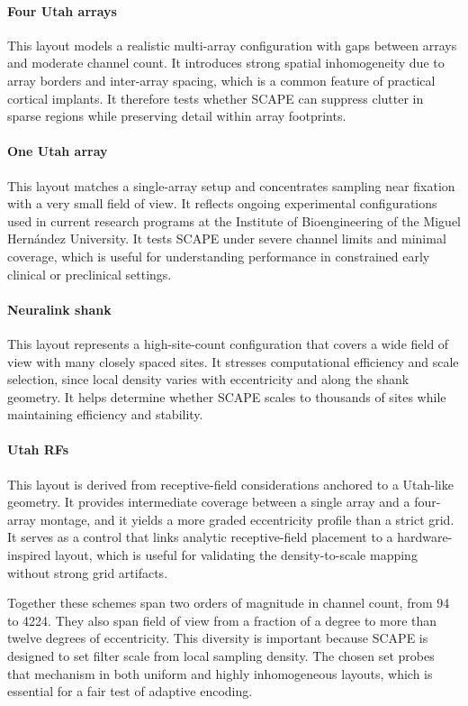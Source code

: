 \paragraph{Four Utah arrays}
This layout models a realistic multi-array configuration with gaps between arrays and moderate channel count. It introduces strong spatial inhomogeneity due to array borders and inter-array spacing, which is a common feature of practical cortical implants. It therefore tests whether SCAPE can suppress clutter in sparse regions while preserving detail within array footprints.

\paragraph{One Utah array}
This layout matches a single-array setup and concentrates sampling near fixation with a very small field of view. It reflects ongoing experimental configurations used in current research programs at the Institute of Bioengineering of the Miguel Hernández University. It tests SCAPE under severe channel limits and minimal coverage, which is useful for understanding performance in constrained early clinical or preclinical settings.

\paragraph{Neuralink shank}
This layout represents a high-site-count configuration that covers a wide field of view with many closely spaced sites. It stresses computational efficiency and scale selection, since local density varies with eccentricity and along the shank geometry. It helps determine whether SCAPE scales to thousands of sites while maintaining efficiency and stability.

\paragraph{Utah RFs}
This layout is derived from receptive-field considerations anchored to a Utah-like geometry. It provides intermediate coverage between a single array and a four-array montage, and it yields a more graded eccentricity profile than a strict grid. It serves as a control that links analytic receptive-field placement to a hardware-inspired layout, which is useful for validating the density-to-scale mapping without strong grid artifacts.

\medskip
Together these schemes span two orders of magnitude in channel count, from 94 to 4224. They also span field of view from a fraction of a degree to more than twelve degrees of eccentricity. This diversity is important because SCAPE is designed to set filter scale from local sampling density. The chosen set probes that mechanism in both uniform and highly inhomogeneous layouts, which is essential for a fair test of adaptive encoding.


